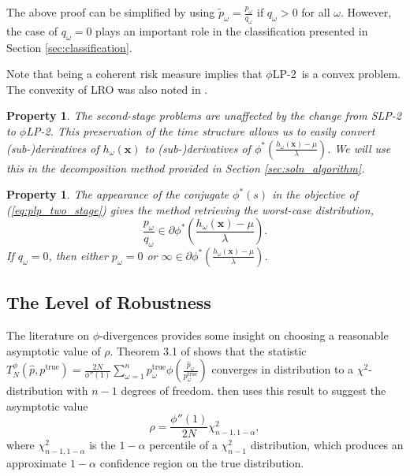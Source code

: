 \documentclass[ijoc,nonblindrev]{informs3} %
\newcommand{\x}{\mathbf{x}}
\newcommand{\ptrue}{p^{\text{true}}}
\newtheorem{property}[theorem]{Property}
\newcommand{\plp}{$\phi$LP-2}
\begin{document}
\begin{remark}
	The above proof can be simplified by using $\tilde{p}_\omega = \frac{p_\omega}{q_\omega}$ if $q_\omega > 0$ for all $\omega$.
	However, the case of $q_\omega = 0$ plays an important role in the classification presented in Section \ref{sec:classification}.
\end{remark}


Note that being a coherent risk measure implies that \plp\ is a convex problem.
The convexity of LRO was also noted in \cite{wang2010likelihood}.

\begin{property}
	The second-stage problems are unaffected by the change from SLP-2 to \plp.
	This preservation of the time structure allows us to easily convert (sub-)derivatives of $h_\omega(\x)$ to (sub-)derivatives of $\phi^*\left(\frac{h_\omega(\x) - \mu}{\lambda}\right)$.
	We will use this in the decomposition method provided in Section \ref{sec:soln_algorithm}.
\end{property}

\begin{property}
	The appearance of the conjugate $\phi^*(s)$ in the objective of (\ref{eq:plp_two_stage}) gives the method retrieving the worst-case distribution,
	\begin{equation} \label{eq:p_worst}
		\frac{p_\omega}{q_\omega} \in \partial \phi^*\left(\frac{h_\omega(\x)-\mu}{\lambda}\right).
	\end{equation}
	If $q_\omega = 0$, then either $p_\omega = 0$ or $\infty \in \partial \phi^*\left(\frac{h_\omega(\x)-\mu}{\lambda}\right)$.
\end{property}

\subsection{The Level of Robustness}
\label{ssec:robust_level}

The literature on $\phi$-divergences provides some insight on choosing a reasonable asymptotic value of $\rho$.
Theorem 3.1 of \cite{pardo2005statistical} shows that the statistic $T^\phi_N(\hat{p},\ptrue) = \frac{2N}{\phi''(1)} \sum_{\omega=1}^n \ptrue_\omega \phi\left(\frac{\hat{p}_\omega}{\ptrue_\omega}\right)$ converges in distribution to a $\chi^2$-distribution with $n-1$ degrees of freedom.
\cite{bental2011robust} then uses this result to suggest the asymptotic value
\begin{equation} \label{eq:asymptotic_rho}
	\rho = \frac{\phi''(1)}{2N} \chi^2_{n-1,1-\alpha},
\end{equation}
where $\chi^2_{n-1,1-\alpha}$ is the $1-\alpha$ percentile of a $\chi^2_{n-1}$ distribution, which produces an approximate $1-\alpha$ confidence region on the true distribution.
\end{document}
